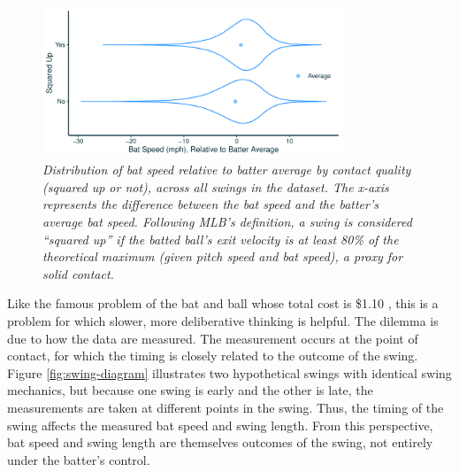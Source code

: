 \documentclass{article}
\begin{document}
    \begin{figure}[H]
      \centering
      \includegraphics[width = 0.8\textwidth]{../../figures/counterintuitive.pdf}
      \caption{\it Distribution of bat speed relative to batter average by contact quality (squared up or not), across all swings in the dataset. The x-axis represents the difference between the bat speed and the batter's average bat speed. Following MLB's definition, a swing is considered ``squared up'' if the batted ball's exit velocity is at least 80\% of the theoretical maximum (given pitch speed and bat speed), a proxy for solid contact.}
      \label{fig:counterintuitive}
    \end{figure}

    Like the famous problem of the bat and ball whose total cost is \$1.10 \citep{kahneman_thinking_2011}, this is a problem for which slower, more deliberative thinking is helpful. The dilemma is due to how the data are measured. The measurement occurs at the point of contact, for which the timing is closely related to the outcome of the swing. Figure \ref{fig:swing-diagram} illustrates two hypothetical swings with identical swing mechanics, but because one swing is early and the other is late, the measurements are taken at different points in the swing. Thus, the timing of the swing affects the measured bat speed and swing length. From this perspective, bat speed and swing length are themselves outcomes of the swing, not entirely under the batter's control.
\end{document}
